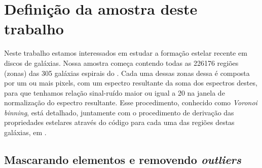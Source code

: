 \section{Definição da amostra deste trabalho}
\label{sec:amostra:definicao}

Neste trabalho estamos interessados em estudar a formação estelar recente em discos de galáxias.
Nossa amostra começa contendo todas as 226176 regiões (zonas) das 305 galáxias espirais do \CAL.
Cada uma dessas zonas dessa é composta por um ou mais pixels, com um espectro resultante da soma dos
espectros destes, para que tenhamos relação sinal-ruído maior ou igual a 20 na janela de
normalização do espectro resultante. Esse procedimento, conhecido como {\em Voronoi binning}, está
detalhado, juntamente com o procedimento de derivação das propriedades estelares através do código
\starlight para cada uma das regiões destas galáxias, em \citet{CidFernandes.etal.2013a}.

\subsection{Mascarando elementos e removendo {\em outliers}}
\label{sec:amostra:mask}

